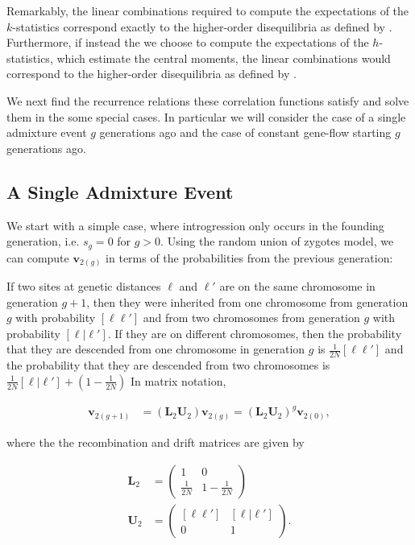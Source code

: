 \documentclass[11pt]{amsart}
\begin{document}
Remarkably, the linear combinations required to compute the expectations of the $k$-statistics correspond exactly to the higher-order disequilibria as defined by \citet{bennett1952theory}.
Furthermore, if instead the we choose to compute the expectations of the $h$-statistics, which estimate the central moments, the linear combinations would correspond to the higher-order disequilibria as defined by \citet{slatkin1972treating}.

We next find the recurrence relations these correlation functions satisfy and solve them in the some special cases. In particular we will consider the case of a single admixture event $g$ generations ago and the case of constant gene-flow starting $g$ generations ago.

\subsection*{A Single Admixture Event}
We start with a simple case, where introgression only occurs in the founding generation, i.e. $s_g=0$ for $g>0$. Using the random union of zygotes model, we can compute $\mathbf{v}_{2(g)}$ in terms of the probabilities from the previous generation:

If two sites at genetic distances $\ell$ and $\ell'$ are on the same chromosome in generation $g+1$, then they were inherited from one chromosome from generation $g$ with probability $[\ell\ell']$ and from two chromosomes from generation $g$ with probability $[\ell|\ell']$.
If they are on different chromosomes, then the probability that they are descended from one chromosome in generation $g$ is $\frac{1}{2N}[\ell\ell']$ and the probability that they are descended from two chromosomes is $\frac{1}{2N}[\ell|\ell']+\left(1-\frac{1}{2N}\right)$
In matrix notation, 

\begin{align*}
\mathbf{v}_{2(g+1)}&=
		\left(\mathbf{L}_2\mathbf{U}_2\right)
		\mathbf{v}_{2(g)}
		= \left(\mathbf{L}_2\mathbf{U}_2\right)^g
		\mathbf{v}_{2(0)},
\end{align*}

where the the recombination and drift matrices are given by

\begin{align*}
	\mathbf{L}_2&=\left( \begin{array}{cc}
					 1 & 0\\
					 \frac{1}{2N} & 1-\frac{1}{2N}
				\end{array} \right)\\
		\mathbf{U}_2&=\left( \begin{array}{cc}
					 {[\ell \ell']} & [\ell|\ell']\\
					 0 & 1
				\end{array} \right).
\end{align*}
\end{document}
